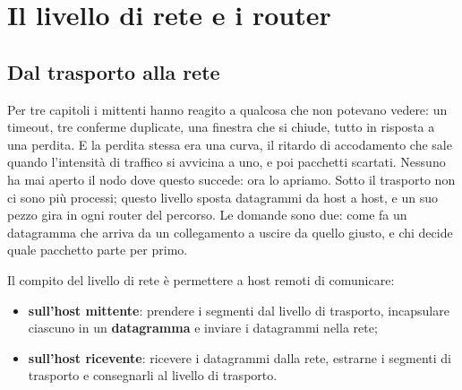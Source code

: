 \chapter{Il livello di rete e i router}

\begin{center}
\end{center}

\section{Dal trasporto alla rete}

Per tre capitoli i mittenti hanno reagito a qualcosa che non potevano vedere: un timeout, tre conferme duplicate, una
finestra che si chiude, tutto in risposta a una perdita. E la perdita stessa era una curva, il ritardo di accodamento che
sale quando l'intensità di traffico si avvicina a uno, e poi pacchetti scartati. Nessuno ha mai aperto il nodo dove questo
succede: ora lo apriamo. Sotto il trasporto non ci sono più processi; questo livello sposta datagrammi da host a host, e
un suo pezzo gira in ogni router del percorso. Le domande sono due: come fa un datagramma che arriva da un collegamento a
uscire da quello giusto, e chi decide quale pacchetto parte per primo.

Il compito del livello di rete è permettere a host remoti di comunicare:

\begin{itemize}
    \item \textbf{sull'host mittente}: prendere i segmenti dal livello di trasporto, incapsulare ciascuno in un
          \textbf{datagramma} e inviare i datagrammi nella rete;
    \item \textbf{sull'host ricevente}: ricevere i datagrammi dalla rete, estrarne i segmenti di trasporto e
          consegnarli al livello di trasporto.
\end{itemize}

